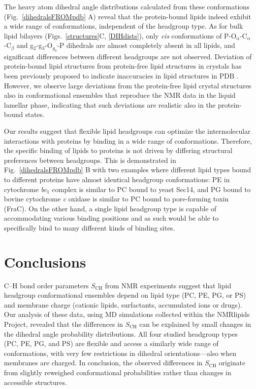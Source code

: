 \documentclass[journal=jpcbfk,manuscript=article]{achemso}
\begin{document}
The heavy atom dihedral angle distributions calculated from these conformations 
(Fig.~\ref{dihedralsFROMpdb} A) reveal that the protein-bound lipids indeed exhibit a wide
range of conformations, independent of the headgroup type.
As for bulk lipid bilayers (Figs.~\ref{structures}C, \ref{DIHdists}), only {\it cis} conformations
of P-O$_\alpha$-C$_\alpha$-C$_\beta$ and g$_2$-g$_3$-O$_{g_3}$-P dihedrals are almost
completely absent in all lipids, and significant differences between
different headgroups are not observed.
Deviation of protein-bound lipid structures from protein-free lipid structures in crystals 
has been previously proposed to indicate inaccuracies in lipid structures in PDB \cite{marsh13b,pezeshkian18}. 
However, we observe large deviations from the protein-free lipid crystal structures also in conformational ensembles
that reproduce the NMR data in the liquid lamellar phase, indicating that such deviations
are realistic also in the protein-bound states.


Our results suggest that flexible lipid headgroups can optimize the intermolecular interactions with proteins by binding
in a wide range of conformations.
Therefore, the specific binding of lipids to proteins is not driven by differing structural preferences between headgroups.
This is demonstrated in Fig.~\ref{dihedralsFROMpdb} B with two examples where different lipid types bound to
different proteins have almost identical headgroup conformations:
PE in cytochrome {\it bc}$_1$ complex is similar to PC bound to yeast Sec14,
and PG bound to bovine cytochrome {\it c} oxidase is similar to PC bound to pore-forming toxin (FraC).
On the other hand, a single lipid headgroup type is capable of accommodating various binding positions and as such would 
be able to specifically bind to many different kinds of binding sites.


\section{Conclusions}

C--H bond order parameters $S_\mathrm{CH}$ from NMR experiments 
suggest that lipid headgroup conformational ensembles depend on lipid type (PC, PE, PG, or PS) 
and membrane charge (cationic lipids, surfactants, accumulated ions or drugs). 
Our analysis of these data, using MD simulations collected
within the NMRlipids Project,
revealed that the differences in $S_\mathrm{CH}$ can be explained
by small changes in the dihedral angle probability distributions.
All four studied headgroup types (PC, PE, PG, and PS) are flexible
and access a similarly wide range of conformations, with very few restrictions in dihedral orientations---also when membranes are charged.
In conclusion, the observed differences in $S_\mathrm{CH}$ originate from
slightly reweighed conformational probabilities rather than changes in accessible structures.
\end{document}
